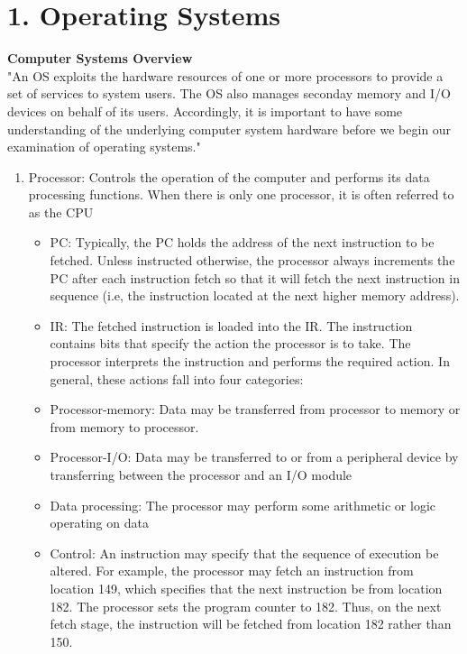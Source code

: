 \documentclass{article}
\begin{document}
\newpage
\section*{1. Operating Systems}

\textbf{Computer Systems Overview}\\

"An OS exploits the hardware resources of one or more processors to provide a set of services to system users. The OS also manages seconday memory and I/O devices on behalf of its users. Accordingly, it is important to have some understanding of the underlying computer system hardware before we begin our examination of operating systems."

\begin{enumerate}[label = \arabic*]
\item Processor: Controls the operation of the computer and performs its data processing functions. When there is only one processor, it is often referred to as the CPU
	\begin{itemize}
	\item PC: Typically, the PC holds the address of the next instruction to be fetched. Unless instructed otherwise, the processor always increments the PC after each instruction fetch so that it will fetch the next instruction in sequence (i.e, the instruction located at the next higher memory address).
	\item IR: The fetched instruction is loaded into the IR. The instruction contains bits that specify the action the processor is to take. The processor interprets the instruction and performs the required action. In general, these actions fall into four categories:
		\item[] Processor-memory: Data may be transferred from processor to memory or from memory to processor.
		\item[] Processor-I/O: Data may be transferred to or from a peripheral device by transferring between the processor and an I/O module
		\item[] Data processing: The processor may perform some arithmetic or logic operating on data
		\item[] Control: An instruction may specify that the sequence of execution be altered. For example, the processor may fetch an instruction from location 149, which specifies that the next instruction be from location 182. The processor sets the program counter to 182. Thus, on the next fetch stage, the instruction will be fetched from location 182 rather than 150.


\end{itemize}
\end{enumerate}
\end{document}
